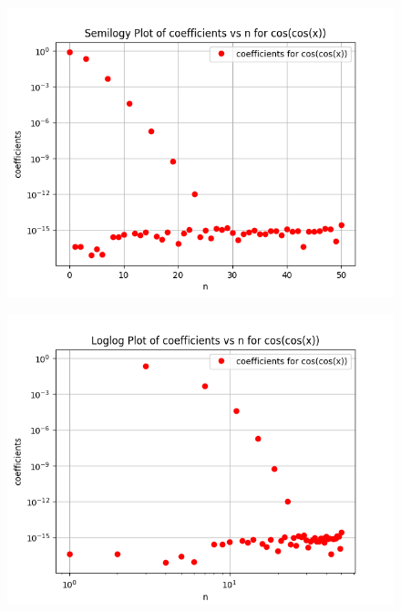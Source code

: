 \documentclass[11pt, a4paper]{article}
\begin{document}
\begin{figure}[H]
     \centering
     \includegraphics[scale=0.8]{Figure_5.png}
\end{figure}


\begin{figure}[H]
     \centering
     \includegraphics[scale=0.8]{Figure_6.png}
\end{figure}
\end{document}
